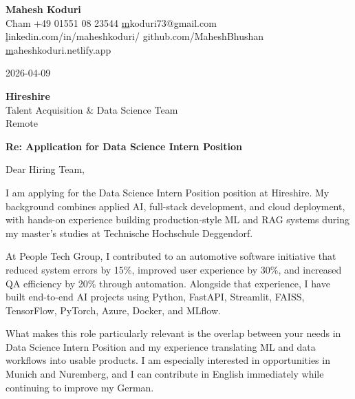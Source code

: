 \documentclass[11pt,a4paper]{letter}
\begin{document}
\begin{center}
    {\LARGE \textbf{ Mahesh Koduri }}\\[0.3cm]
     Cham \quad
     +49 01551 08 23544 \quad
     \href{mailto:mkoduri73@gmail.com}mkoduri73@gmail.com\\[0.2cm]
     \href{https://linkedin.com/in/maheshkoduri/}linkedin.com/in/maheshkoduri/ \quad
     \href{https://github.com/MaheshBhushan}github.com/MaheshBhushan \quad
     \href{https://maheshkoduri.netlify.app}maheshkoduri.netlify.app
\end{center}

\vspace{0.5cm}

2026-04-09

\vspace{0.5cm}

\textbf{ Hireshire }\\
Talent Acquisition \& Data Science Team\\
Remote

\vspace{0.5cm}

\textbf{Re: Application for Data Science Intern Position}

\vspace{0.5cm}

Dear Hiring Team,

I am applying for the Data Science Intern Position position at Hireshire. My background combines applied AI, full-stack development, and cloud deployment, with hands-on experience building production-style ML and RAG systems during my master's studies at Technische Hochschule Deggendorf.

At People Tech Group, I contributed to an automotive software initiative that reduced system errors by 15\%, improved user experience by 30\%, and increased QA efficiency by 20\% through automation. Alongside that experience, I have built end-to-end AI projects using Python, FastAPI, Streamlit, FAISS, TensorFlow, PyTorch, Azure, Docker, and MLflow.

What makes this role particularly relevant is the overlap between your needs in Data Science Intern Position and my experience translating ML and data workflows into usable products. I am especially interested in opportunities in Munich and Nuremberg, and I can contribute in English immediately while continuing to improve my German.
\end{document}

